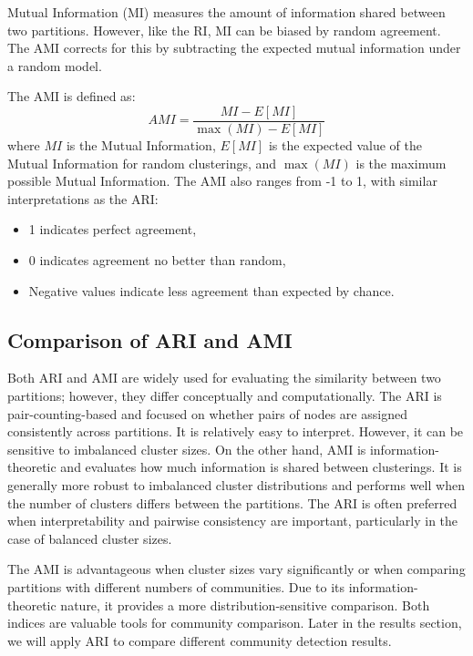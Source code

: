 Mutual Information (MI) measures the amount of information shared between two partitions.
However, like the RI, MI can be biased by random agreement. The AMI corrects
for this by subtracting the expected mutual information under a random model.

The AMI is defined as:
\begin{equation}
    AMI = \frac{MI - E[MI]}{\max(MI) - E[MI]}
\end{equation}
where $MI$ is the Mutual Information, $E[MI]$ is the expected value of the Mutual
Information for random clusterings, and $\max(MI)$ is the maximum possible Mutual Information.
The AMI also ranges from -1 to 1, with similar interpretations as the ARI:
\begin{itemize}
    \item 1 indicates perfect agreement,
    \item 0 indicates agreement no better than random,
    \item Negative values indicate less agreement than expected by chance.
\end{itemize}

\subsection{Comparison of ARI and AMI}

Both ARI and AMI are widely used for evaluating the similarity between two partitions; 
however, they differ conceptually and computationally.
The ARI is pair-counting-based and focused on whether pairs of nodes are assigned consistently 
across partitions. It is relatively easy to interpret. However, it can be sensitive
to imbalanced cluster sizes.
On the other hand, AMI is information-theoretic and evaluates how much information is shared 
between clusterings. It is generally more robust to imbalanced cluster distributions
and performs well when the number of clusters differs between the partitions.
The ARI is often preferred when interpretability and pairwise consistency
are important, particularly in the case of balanced cluster sizes.

The AMI is advantageous when cluster sizes vary significantly or when
comparing partitions with different numbers of communities.
Due to its information-theoretic nature, it provides a more distribution-sensitive comparison.
Both indices are valuable tools for community comparison.
Later in the results section, we will apply ARI to compare different
community detection results.


